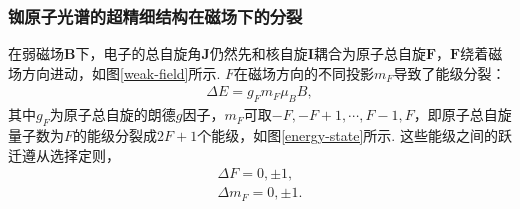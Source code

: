 \documentclass[UTF8,a4paper,10pt]{article}
\begin{document}
\subsubsection{铷原子光谱的超精细结构在磁场下的分裂}

在弱磁场$\bm{B}$下，电子的总自旋角$\bm{J}$仍然先和核自旋$\bm{I}$耦合为原子总自旋$\bm{F}$，$\bm{F}$绕着磁场方向进动，如图\ref{weak-field}所示. $F$在磁场方向的不同投影$m_F$导致了能级分裂：
\begin{align}
    \Delta E=g_Fm_F\mu_BB,
\end{align}
其中$g_F$为原子总自旋的朗德$g$因子，$m_F$可取$-F,-F+1,\cdots,F-1,F$，即原子总自旋量子数为$F$的能级分裂成$2F+1$个能级，如图\ref{energy-state}所示. 这些能级之间的跃迁遵从选择定则，
\begin{gather}
    \Delta F=0,\pm 1,\\
    \Delta m_F=0,\pm 1.
\end{gather}

\begin{figure}[ht]
    \centering
\end{figure}
\end{document}
